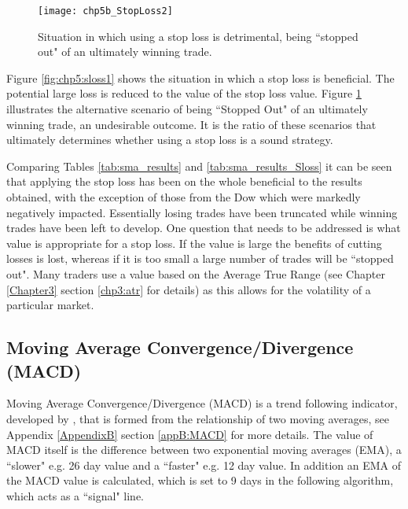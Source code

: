 \begin{figure}[tbph]
\centering
\texttt{[image: chp5b\_StopLoss2]}
\caption[Situation in which using a stop loss is detrimental]{Situation in which using a stop loss is detrimental, being \textquotedblleft stopped out" of an ultimately winning trade.}
\label{fig:chp5:sloss2}
\end{figure}

Figure \ref{fig:chp5:sloss1} shows the situation in which a stop loss is beneficial. The potential large loss is reduced to the value of the stop loss value. Figure \ref{fig:chp5:sloss2} illustrates the alternative scenario of being \textquotedblleft Stopped Out" of an ultimately winning trade, an undesirable outcome. It is the ratio of these scenarios that ultimately determines whether using a stop loss is a sound strategy.



Comparing Tables \ref{tab:sma_results} and \ref{tab:sma_results_Sloss}
it can be seen that applying the stop loss has been on the whole beneficial to the results obtained, with the exception of those from the Dow which were markedly negatively impacted. Essentially losing trades have been truncated while winning trades have been left to develop. One question that needs to be addressed is what value is appropriate for a stop loss. If the value is large the benefits of cutting losses is lost, whereas if it is too small a large number of trades will be \textquotedblleft stopped out". Many traders use a value based on the Average True Range (see Chapter \ref{Chapter3} section \ref{chp3:atr} for details) as this allows for the volatility of a particular market.

\subsection{Moving Average Convergence/Divergence (MACD)}
\label{sec:chp4macd}
Moving Average Convergence/Divergence (MACD) is a trend following indicator, developed by \cite{appel2005technical}, that is formed from the relationship of two moving averages, see Appendix \ref{AppendixB} section \ref{appB:MACD} for more details. The value of MACD itself is the difference between two exponential moving averages (EMA), a \textquotedblleft slower" e.g. 26 day value and a \textquotedblleft faster" e.g. 12 day value. In addition an EMA of the MACD value is calculated, which is set to 9 days in the following algorithm, which acts as a \textquotedblleft signal" line.
 
